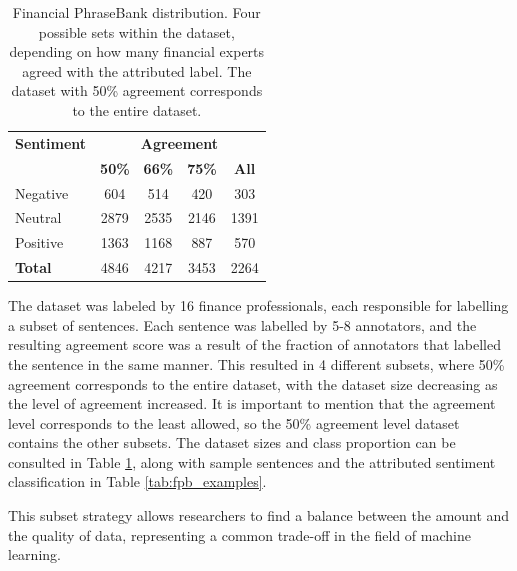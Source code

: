 \documentclass[conference]{IEEEtran}
\begin{document}
\begin{table}[H]
\centering
\caption{Financial PhraseBank distribution. Four possible sets within the dataset, depending on how many financial experts agreed with the attributed label. The dataset with 50\% agreement corresponds to the entire dataset.}

\label{agreement_datasets}
\begin{tabular}{lcccc}
\toprule
\textbf{Sentiment} & \multicolumn{4}{c}{\textbf{Agreement}} \\
\cmidrule(lr){2-5}
 & \textbf{50\%} & \textbf{66\%} & \textbf{75\%} & \textbf{All} \\
\midrule
Negative & 604 & 514 & 420 & 303 \\
Neutral & 2879 & 2535 & 2146 & 1391 \\
Positive & 1363 & 1168 & 887 & 570 \\
\midrule
\textbf{Total} & 4846 & 4217 & 3453 & 2264 \\
\bottomrule
\end{tabular}
\end{table}

The dataset was labeled by 16 finance professionals, each responsible for labelling a subset of sentences. Each sentence was labelled by 5-8 annotators, and the resulting agreement score was a result of the fraction of annotators that labelled the sentence in the same manner. This resulted in 4 different subsets, where 50\% agreement corresponds to the entire dataset, with the dataset size decreasing as the level of agreement increased. It is important to mention that the agreement level corresponds to the least allowed, so the 50\% agreement level dataset contains the other subsets. The dataset sizes and class proportion can be consulted in Table \ref{agreement_datasets}, along with sample sentences and the attributed sentiment classification in Table \ref{tab:fpb_examples}.

This subset strategy allows researchers to find a balance between the amount and the quality of data, representing a common trade-off in the field of machine learning.

\end{document}
